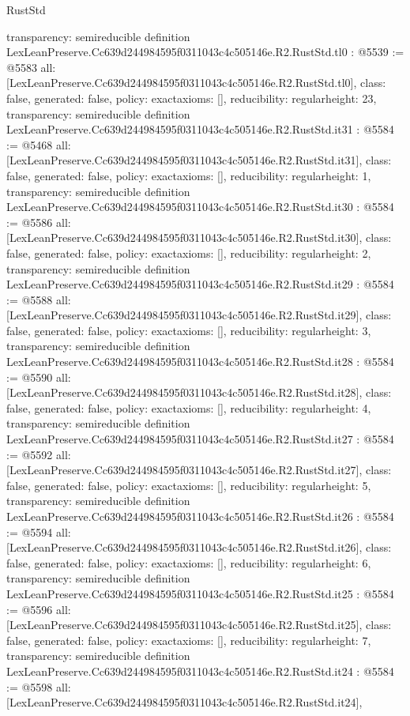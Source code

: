 \begin{lexlean}{RustStd}
\begin{coremodule}
{  transparency: semireducible
}
definition LexLeanPreserve.Cc639d244984595f0311043c4c505146e.R2.RustStd.tl0 : @5539 := @5583 {
  all: [LexLeanPreserve.Cc639d244984595f0311043c4c505146e.R2.RustStd.tl0],
  class: false,
  generated: false,
  policy: exact{axioms: []},
  reducibility: regular{height: 23},
  transparency: semireducible
}
definition LexLeanPreserve.Cc639d244984595f0311043c4c505146e.R2.RustStd.it31 : @5584 := @5468 {
  all: [LexLeanPreserve.Cc639d244984595f0311043c4c505146e.R2.RustStd.it31],
  class: false,
  generated: false,
  policy: exact{axioms: []},
  reducibility: regular{height: 1},
  transparency: semireducible
}
definition LexLeanPreserve.Cc639d244984595f0311043c4c505146e.R2.RustStd.it30 : @5584 := @5586 {
  all: [LexLeanPreserve.Cc639d244984595f0311043c4c505146e.R2.RustStd.it30],
  class: false,
  generated: false,
  policy: exact{axioms: []},
  reducibility: regular{height: 2},
  transparency: semireducible
}
definition LexLeanPreserve.Cc639d244984595f0311043c4c505146e.R2.RustStd.it29 : @5584 := @5588 {
  all: [LexLeanPreserve.Cc639d244984595f0311043c4c505146e.R2.RustStd.it29],
  class: false,
  generated: false,
  policy: exact{axioms: []},
  reducibility: regular{height: 3},
  transparency: semireducible
}
definition LexLeanPreserve.Cc639d244984595f0311043c4c505146e.R2.RustStd.it28 : @5584 := @5590 {
  all: [LexLeanPreserve.Cc639d244984595f0311043c4c505146e.R2.RustStd.it28],
  class: false,
  generated: false,
  policy: exact{axioms: []},
  reducibility: regular{height: 4},
  transparency: semireducible
}
definition LexLeanPreserve.Cc639d244984595f0311043c4c505146e.R2.RustStd.it27 : @5584 := @5592 {
  all: [LexLeanPreserve.Cc639d244984595f0311043c4c505146e.R2.RustStd.it27],
  class: false,
  generated: false,
  policy: exact{axioms: []},
  reducibility: regular{height: 5},
  transparency: semireducible
}
definition LexLeanPreserve.Cc639d244984595f0311043c4c505146e.R2.RustStd.it26 : @5584 := @5594 {
  all: [LexLeanPreserve.Cc639d244984595f0311043c4c505146e.R2.RustStd.it26],
  class: false,
  generated: false,
  policy: exact{axioms: []},
  reducibility: regular{height: 6},
  transparency: semireducible
}
definition LexLeanPreserve.Cc639d244984595f0311043c4c505146e.R2.RustStd.it25 : @5584 := @5596 {
  all: [LexLeanPreserve.Cc639d244984595f0311043c4c505146e.R2.RustStd.it25],
  class: false,
  generated: false,
  policy: exact{axioms: []},
  reducibility: regular{height: 7},
  transparency: semireducible
}
definition LexLeanPreserve.Cc639d244984595f0311043c4c505146e.R2.RustStd.it24 : @5584 := @5598 {
  all: [LexLeanPreserve.Cc639d244984595f0311043c4c505146e.R2.RustStd.it24],
}
\end{coremodule}
\end{lexlean}
